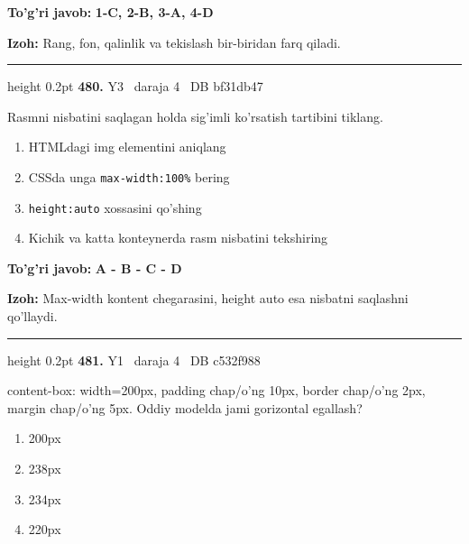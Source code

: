 \documentclass[10pt,a4paper,oneside]{article}
\begin{document}
\begin{tcolorbox}[enhanced,breakable,colback=teal!4,colframe=teal!45!black,boxrule=0.45pt,arc=1.2mm,left=2.8mm,right=2.8mm,top=2mm,bottom=2mm,before skip=2mm,after skip=2mm]
\textbf{\color{teal}To'g'ri javob:} \textbf{1-C, 2-B, 3-A, 4-D}
\par\smallskip
\textbf{Izoh:} Rang, fon, qalinlik va tekislash bir-biridan farq qiladi.
\end{tcolorbox}
\vspace{2mm}\hrule height 0.2pt \vspace{4mm}
\hypertarget{q480}{\textbf{\color{ink}480.}}  {\color{muted}\scriptsize Y3 \textbullet\ daraja 4 \textbullet\ DB bf31db47}
\par
Rasmni nisbatini saqlagan holda sig'imli ko'rsatish tartibini tiklang.
\begin{enumerate}[label=\Alph*),leftmargin=9mm]
\item HTMLdagi img elementini aniqlang
\item CSSda unga \texttt{max-width:100\%} bering
\item \texttt{height:auto} xossasini qo'shing
\item Kichik va katta konteynerda rasm nisbatini tekshiring
\end{enumerate}
\begin{tcolorbox}[enhanced,breakable,colback=teal!4,colframe=teal!45!black,boxrule=0.45pt,arc=1.2mm,left=2.8mm,right=2.8mm,top=2mm,bottom=2mm,before skip=2mm,after skip=2mm]
\textbf{\color{teal}To'g'ri javob:} \textbf{A - B - C - D}
\par\smallskip
\textbf{Izoh:} Max-width kontent chegarasini, height auto esa nisbatni saqlashni qo'llaydi.
\end{tcolorbox}
\vspace{2mm}\hrule height 0.2pt \vspace{4mm}
\hypertarget{q481}{\textbf{\color{ink}481.}}  {\color{muted}\scriptsize Y1 \textbullet\ daraja 4 \textbullet\ DB c532f988}
\par
content-box: width=200px, padding chap/o'ng 10px, border chap/o'ng 2px, margin chap/o'ng 5px. Oddiy modelda jami gorizontal egallash?
\begin{enumerate}[label=\Alph*),leftmargin=9mm]
\item 200px
\item 238px
\item 234px
\item 220px
\end{enumerate}
\end{document}
